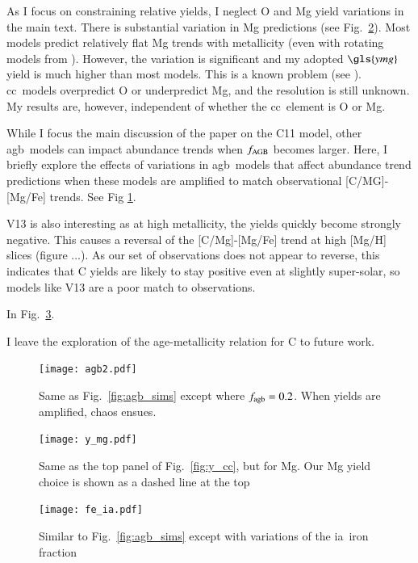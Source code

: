 \documentclass[12pt,oneside,letterpaper]{report}
\newcommand{\cc}{\gls{cc}}
\newcommand{\agb}{\gls{agb}}
\newcommand{\ia}{\gls{ia}}
\newcommand{\Yoc}{\gls{ymg}}
\begin{document}
As I focus on constraining relative yields, I neglect O and Mg yield variations in the main text. There is substantial variation in Mg predictions (see Fig.~\ref{fig:y_mg}). Most models predict relatively flat Mg trends with metallicity (even with rotating models from \citealt{LC18}). However, the variation is significant and my adopted $\Yoc$ yield is much higher than most models. This is a known problem (see \citet{emily+21}). \cc\ models overpredict O or underpredict Mg, and the resolution is still unknown. 
My results are, however, independent of whether the \cc\ element is O or Mg.

While I focus the main discussion of the paper on the C11 model, other \agb\ models can impact abundance trends when $f_{\rm AGB}$ becomes larger.
Here, I briefly explore the effects of variations in \agb\ models that affect abundance trend predictions when these models are amplified to match observational [C/MG]-[Mg/Fe] trends. 
See Fig \ref{fig:fagb2}.

V13 is also interesting as at high metallicity, the yields quickly become strongly negative. This causes a reversal of the [C/Mg]-[Mg/Fe] trend at high [Mg/H] slices (figure ...). As our set of observations does not appear to reverse, this indicates that C yields are likely to stay positive even at slightly super-solar, so models like V13 are a poor match to observations. 

In Fig.~\ref{fig:fe_ia}.

I leave the exploration of the age-metallicity relation for C to future work.


\begin{figure}[htp]
    \centering
    \texttt{[image: agb2.pdf]}

    \caption[Alternate low mass star yield models]{Same as Fig.~\ref{fig:agb_sims} except where $f_{\rm agb}=0.2$. When yields are amplified, chaos ensues.}
    \label{fig:fagb2}
\end{figure}


\begin{figure}
    \centering
    \texttt{[image: y\_mg.pdf]}
    \caption[Magnesium yields]{Same as the top panel of Fig.~\ref{fig:y_cc}, but for Mg. Our Mg yield choice is shown as a dashed line at the top
    }
    \label{fig:y_mg}
\end{figure}

\begin{figure}
    \centering
    \texttt{[image: fe\_ia.pdf]}
    \caption[Adjusting type Ia iron]{Similar to Fig.~\ref{fig:agb_sims} except with variations of the \ia\ iron fraction}
    \label{fig:fe_ia}
\end{figure}
\end{document}
